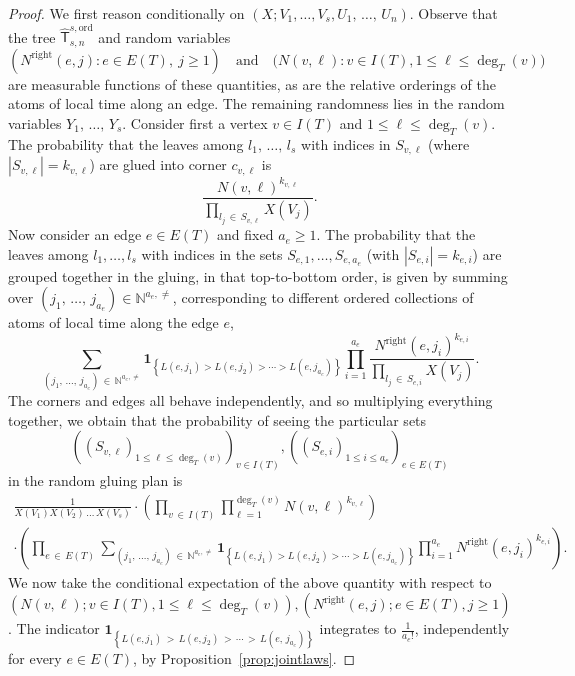 \documentclass[AHL,Unicode,longabstracts,published]{cedram}
\newcommand{\ind}[1]{\mathbf{1}_{\left\lbrace #1 \right\rbrace}}
\newcommand{\ord}{\mathrm{ord}}
\newcommand{\Rightll}{\mathrm{right}}
\newcommand{\sT}{\mathsf{T}}
\newcommand{\N}{\mathbb{N}}
\begin{document}
\begin{proof}
We first reason conditionally on $(X; V_1, \ldots, V_s, U_1,\,\ldots,\, U_n)$. Observe that the tree $\widehat{\sT}_{s,n}^{s,\ord}$ and random variables 
\[
\left(N^{\Rightll}(e,j) : e\in E(T), \ j\geq 1\right)\quad\text{and}\quad\big(N(v,\ell) : v\in I(T), 1\leq \ell \leq \deg_T(v)\big)
\]
are measurable functions of these quantities, as are the relative orderings of the atoms of local time along an edge. The remaining randomness lies in the random variables $Y_1,\,\ldots,\, Y_s$. Consider first a vertex $v \in I(T)$ and $1 \le \ell \le \deg_T(v)$. The probability that the leaves among $l_1,\,\ldots,\,l_s$ with indices in $S_{v,\ell}$ (where $|S_{v,\ell}| = k_{v,\ell}$) are glued into corner $c_{v,\ell}$ is
\[
\frac{N(v,\ell)^{k_{v,\ell}}}{\prod\limits_{l_j\,\in\,S_{v,\ell}} X(V_j)}.
\]
Now consider an edge $e \in E(T)$ and fixed $a_e \ge 1$. The probability that the leaves among $l_1, \ldots, l_s$ with indices in the sets $S_{e, 1}, \ldots, S_{e,a_e}$ (with $|S_{e,i}| = k_{e,i}$) are grouped together in the gluing, in that top-to-bottom order, is given by summing over $(j_1,\,\ldots, \,j_{a_e}) \in \N^{a_e, \neq}$, corresponding to different ordered collections of atoms of local time along the edge $e$,
\[
\sum_{\left(j_1,\,\ldots,\,j_{a_e}\right)\,\in\, \N^{a_e, \neq}} \ind{L\left(e,j_1\right) > L\left(e, j_2\right) > \cdots > L\left(e, j_{a_e}\right)} \prod_{i=1}^{a_e} \frac{N^{\Rightll}\left(e, j_i\right)^{k_{e, i}}} {\prod\limits_{l_j\,\in\,S_{e,i}} X\left(V_{j}\right)}.
\]
The corners and edges all behave independently, and so multiplying everything together, we obtain that the probability of seeing the particular sets 
\[
((S_{v,\ell})_{1 \le \ell \le \deg_T(v)})_{v \in I(T)}, ((S_{e,i})_{1 \le i \le a_e})_{e \in E(T)} 
\]
in the random gluing plan is
\begin{multline}\label{eq:proba choice atoms}
\frac{1}{X(V_1)X(V_2)\,\dots\,X(V_s)} \cdot \left(\prod_{v\,\in\,I(T)} \prod_{\ell=1}^{\deg_T(v)}N(v,\ell)^{k_{v,\ell}}\right)\\
\cdot \left(\prod_{e\,\in\,E(T)} \sum\limits_{\left(j_1,\,\ldots,\,j_{a_e}\right)\,\in\,\N^{a_e, \neq}}\ind{L\left(e,j_1\right) > L\left(e, j_2\right) > \cdots > L\left(e, j_{a_e}\right)}\prod_{i = 1}^{a_e}N^{\Rightll}\left(e,j_i\right)^{k_{e,i}}\right).
\end{multline}
We now take the conditional expectation of the above quantity with respect to $(N(v,\ell); v\in I(T), 1\leq \ell \leq \deg_T(v)), (N^{\Rightll}(e,j); e\in E(T), j\geq 1)$. The indicator $\ind{L(e,j_1)\,>\,L(e, j_2)\,>\,\cdots\,>\,L(e,\,j_{a_e})}$ integrates to $\frac{1}{a_e!}$, independently for every $e\in E(T)$, by Proposition~\ref{prop:jointlaws}.


\end{proof}
\end{document}

